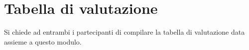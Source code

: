 \documentclass{article}
\begin{document}
\section{Tabella di valutazione}
    Si chiede ad entrambi i partecipanti di compilare la tabella di valutazione data assieme a questo modulo.
\end{document}
